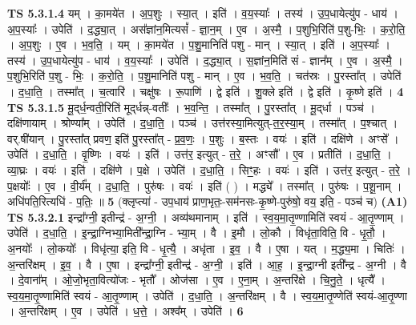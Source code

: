 \documentclass[17pt]{extarticle}
\begin{document}
                  \newline
                                \textbf{ TS 5.3.1.4} \newline
                  यम् । का॒मये॑त । अ॒प॒शुः । स्या॒त् । इति॑ । व॒य॒स्याः᳚ । तस्य॑ । उ॒प॒धायेत्यु॑प - धाय॑ । अ॒प॒स्याः᳚ । उपेति॑ । द॒द्ध्या॒त् । अस᳚ज्ञांन॒मित्यसं᳚ - ज्ञा॒न॒म् । ए॒व । अ॒स्मै॒ । प॒शुभि॒रिति॑ प॒शु-भिः॒ । क॒रो॒ति॒ । अ॒प॒शुः । ए॒व । भ॒व॒ति॒ । यम् । का॒मये॑त । प॒शु॒मानिति॑ पशु - मान् । स्या॒त् । इति॑ । अ॒प॒स्याः᳚ । तस्य॑ । उ॒प॒धायेत्यु॑प - धाय॑ । व॒य॒स्याः᳚ । उपेति॑ । द॒द्ध्या॒त् । स॒ज्ञांन॒मिति॑ सं - ज्ञान᳚म् । ए॒व । अ॒स्मै॒ । प॒शुभि॒रिति॑ प॒शु - भिः॒ । क॒रो॒ति॒ । प॒शु॒मानिति॑ पशु - मान् । ए॒व । भ॒व॒ति॒ । चत॑स्रः । पु॒रस्ता᳚त् । उपेति॑ । द॒धा॒ति॒ । तस्मा᳚त् । च॒त्वारि॑ । चक्षु॑षः । रू॒पाणि॑ । द्वे इति॑ । शु॒क्ले इति॑ । द्वे इति॑ । कृ॒ष्णे इति॑ । \textbf{  4} \newline
                  \newline
                                \textbf{ TS 5.3.1.5} \newline
                  मू॒द्‌र्ध॒न्वती॒रिति॑ मूद्‌र्धन्न्-वतीः᳚ । भ॒व॒न्ति॒ । तस्मा᳚त् । पु॒रस्ता᳚त् । मू॒द्‌र्धा । पञ्च॑ । दक्षि॑णायाम् । श्रोण्या᳚म् । उपेति॑ । द॒धा॒ति॒ । पञ्च॑ । उत्त॑रस्या॒मित्युत्-त॒र॒स्या॒म् । तस्मा᳚त् । प॒श्चात् । वर्.षी॑यान् । पु॒रस्ता᳚त् प्रवण॒ इति॑ पु॒रस्ता᳚त् - प्र॒व॒णः॒ । प॒शुः । ब॒स्तः । वयः॑ । इति॑ । दक्षि॑णे । अꣳसे᳚ । उपेति॑ । द॒धा॒ति॒ । वृ॒ष्णिः । वयः॑ । इति॑ । उत्त॑र॒ इत्युत् - त॒रे॒ । अꣳसौ᳚ । ए॒व । प्रतीति॑ । द॒धा॒ति॒ । व्या॒घ्रः । वयः॑ । इति॑ । दक्षि॑णे । प॒क्षे । उपेति॑ । द॒धा॒ति॒ । सिꣳ॒॒हः । वयः॑ । इति॑ । उत्त॑र॒ इत्युत् - त॒रे॒ । प॒क्षयोः᳚ । ए॒व । वी॒र्य᳚म् । द॒धा॒ति॒ । पुरु॑षः । वयः॑ । इति॑ ( ) । मद्ध्ये᳚ । तस्मा᳚त् । पुरु॑षः । प॒शू॒नाम् । अधि॑पति॒रित्यधि॑ - प॒तिः॒ ॥ \textbf{  5 } \newline
                  \newline
                      (क्लृप्त्या॑ - उप॒धाय॑ प्राण॒भृतः॒-सम॑नसः-कृ॒ष्णे-पुरु॑षो॒ वय॒ इति॒ - पञ्च॑ च)  \textbf{(A1)} \newline \newline
                                \textbf{ TS 5.3.2.1} \newline
                  इन्द्रा᳚ग्नी॒ इतीन्द्र॑ - अ॒ग्नी॒ । अव्य॑थमानाम् । इति॑ । स्व॒य॒मा॒तृ॒ण्णामिति॑ स्वयं - आ॒तृ॒ण्णाम् । उपेति॑ । द॒धा॒ति॒ । इ॒न्द्रा॒ग्निभ्या॒मिती᳚न्द्रा॒ग्नि - भ्या॒म् । वै । इ॒मौ । लो॒कौ । विधृ॑ता॒विति॒ वि - धृ॒तौ॒ । अ॒नयोः᳚ । लो॒कयोः᳚ । विधृ॑त्या॒ इति॒ वि - धृ॒त्यै॒ । अधृ॑ता । इ॒व॒ । वै । ए॒षा । यत् । म॒द्ध्य॒मा । चितिः॑ । अ॒न्तरि॑क्षम् । इ॒व॒ । वै । ए॒षा । इन्द्रा᳚ग्नी॒ इतीन्द्र॑ - अ॒ग्नी॒ । इति॑ । आ॒ह॒ । इ॒न्द्रा॒ग्नी इती᳚न्द्र - अ॒ग्नी । वै । दे॒वाना᳚म् । ओ॒जो॒भृता॒वित्यो॑जः - भृतौ᳚ । ओज॑सा । ए॒व । ए॒ना॒म् । अ॒न्तरि॑क्षे । चि॒नु॒ते॒ । धृत्यै᳚ । स्व॒य॒मा॒तृ॒ण्णामिति॑ स्वयं - आ॒तृ॒ण्णाम् । उपेति॑ । द॒धा॒ति॒ । अ॒न्तरि॑क्षम् । वै । स्व॒य॒मा॒तृ॒ण्णेति॑ स्वयं-आ॒तृ॒ण्णा । अ॒न्तरि॑क्षम् । ए॒व । उपेति॑ । ध॒त्ते॒ । अश्व᳚म् । उपेति॑ । \textbf{  6} \newline
\end{document}

